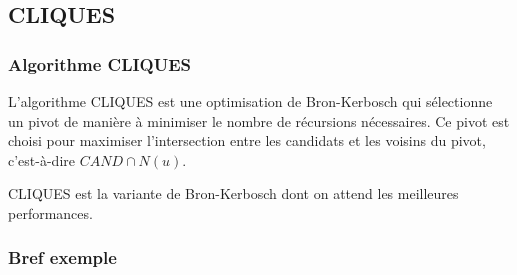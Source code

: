 \documentclass{beamer}
\begin{document}
\subsection{CLIQUES}
\begin{frame}
\frametitle{Algorithme CLIQUES}
L'algorithme CLIQUES est une optimisation de Bron-Kerbosch qui sélectionne un pivot de manière à minimiser le nombre de récursions nécessaires. Ce pivot est choisi pour maximiser l'intersection entre les candidats et les voisins du pivot, c'est-à-dire \(CAND \cap N(u)\).

CLIQUES est la variante de Bron-Kerbosch dont on attend les meilleures performances.
\end{frame}

\begin{frame}
  \frametitle{Bref exemple}
  \begin{columns}
    \begin{figure}
      \centering
\end{figure}
\end{columns}
\end{frame}
\end{document}
